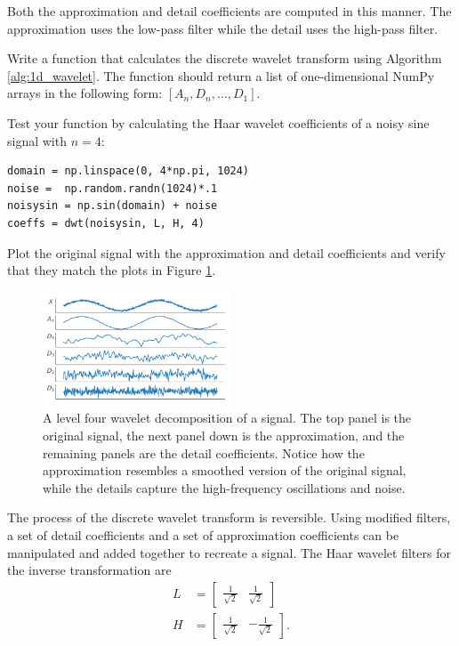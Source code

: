 Both the approximation and detail coefficients are computed in this manner.  The approximation uses the low-pass filter while the detail uses the high-pass filter.
\begin{problem}
Write a function that calculates the discrete wavelet transform using Algorithm \ref{alg:1d_wavelet}.
The function should return a list of one-dimensional NumPy arrays in the following form: $[A_n, D_n, \ldots, D_1]$.


Test your function by calculating the Haar wavelet coefficients of a noisy sine signal with $n=4$:

\begin{lstlisting}
domain = np.linspace(0, 4*np.pi, 1024)
noise =  np.random.randn(1024)*.1
noisysin = np.sin(domain) + noise
coeffs = dwt(noisysin, L, H, 4)
\end{lstlisting}

Plot the original signal with the approximation and detail coefficients and verify that they match the plots in Figure \ref{fig:dwt1D}.
\label{prob:dwt1D}
\end{problem}

\begin{figure}[H]
\centering
\includegraphics[width = 0.5\textwidth]{figures/dwt1D}
\caption{A level four wavelet decomposition of a signal.
The top panel is the original signal, the next panel down is the approximation, and the remaining panels are the detail coefficients.
Notice how the approximation resembles a smoothed version of the original signal, while the details capture the high-frequency oscillations and noise.}
\label{fig:dwt1D}
\end{figure}

The process of the discrete wavelet transform is reversible.
Using modified filters, a set of detail coefficients and a set of approximation coefficients can be manipulated and added together to recreate a signal.
The Haar wavelet filters for the inverse transformation are
\begin{align*}
L &= \begin{bmatrix}\frac{1}{\sqrt{2}} & \frac{1}{\sqrt{2}}\end{bmatrix}\\
H &= \begin{bmatrix}\frac{1}{\sqrt{2}} & -\frac{1}{\sqrt{2}}\end{bmatrix}.
\end{align*}

